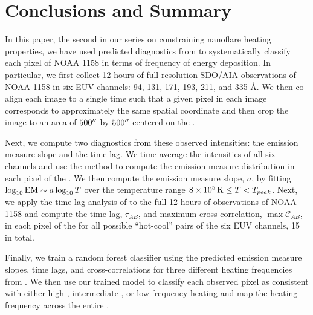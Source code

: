 \section{Conclusions and Summary}\label{sec:conclusions}

In this paper, the second in our series on constraining nanoflare heating properties, we have used predicted diagnostics from  to systematically classify each pixel of \AR{} NOAA 1158 in terms of frequency of energy deposition.
In particular, we first collect 12 hours of full-resolution SDO/AIA observations of NOAA 1158 in six EUV channels: 94, 131, 171, 193, 211, and 335 \AA.
We then co-align each image to a single time such that a given pixel in each image corresponds to approximately the same spatial coordinate and then crop the image to an area of $500\mbox{$^{\prime\prime}$}$-by-$500\mbox{$^{\prime\prime}$}$ centered on the \AR{}.

Next, we compute two diagnostics from these observed intensities: the emission measure slope and the time lag.
We time-average the intensities of all six channels and use the method \citet{hannah_differential_2012} to compute the emission measure distribution in each pixel of the \AR{}.
We then compute the emission measure slope, $a$, by fitting $\log_{10}\textup{EM}\sim a\log_{10}T$ over the temperature range $8\times10^5\,\textup{K}\le T < T_{peak}$. 
Next, we apply the time-lag analysis of \citet{viall_evidence_2012} to the full 12 hours of observations of NOAA 1158 and compute the time lag, $\tau_{AB}$, and maximum cross-correlation, $\max\mathcal{C}_{AB}$, in each pixel of the \AR{} for all possible ``hot-cool'' pairs of the six EUV channels, 15 in total.

Finally, we train a random forest classifier using the predicted emission measure slopes, time lags, and cross-correlations for three different heating frequencies from .
We then use our trained model to classify each observed pixel as consistent with either high-, intermediate-, or low-frequency heating and map the heating frequency across the entire \AR{}.

